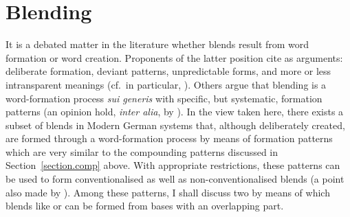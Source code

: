 \documentclass[output=paper
  ,nobabel
  ,draftmode
  ,colorlinks, citecolor=brown
]{langscibook}
\begin{document}
\section{Blending}
\label{section.blend}
It is a debated matter in the literature whether blends result from word
formation or word creation. Proponents of the latter position cite as arguments:
deliberate formation, deviant patterns, unpredictable forms, and more or less
intransparent meanings (cf.\, in particular, \citealt{ronneberger-sibold:2006:lexical:blends,ronneberger-sibold:2015:word:creation}). Others argue that blending is a
word-formation process \emph{sui generis} with specific,
but systematic, formation patterns (an opinion hold, \emph{inter
alia}, by \citealt{mueller:et:al:2011:kontamination}). In the view taken here, there
exists a subset of blends in Modern German systems that, although deliberately
created, are formed through a word-formation process by means of formation
patterns which are very similar to the compounding patterns discussed in
Section \ref{section.comp} above. With appropriate
restrictions, these patterns can be used to form conventionalised as well as
non-conventionalised blends (a point also made by \citealt{schulz:2004:jein:fortschrott}). Among these patterns, I shall discuss
two by means of which blends like \emph{} or \emph{} can be formed from bases with an overlapping
part.
\end{document}
